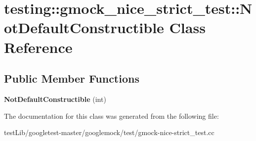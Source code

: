 \hypertarget{classtesting_1_1gmock__nice__strict__test_1_1NotDefaultConstructible}{}\section{testing\+:\+:gmock\+\_\+nice\+\_\+strict\+\_\+test\+:\+:Not\+Default\+Constructible Class Reference}
\label{classtesting_1_1gmock__nice__strict__test_1_1NotDefaultConstructible}
\subsection*{Public Member Functions}
\begin{DoxyCompactItemize}
\item 
\mbox{\label{classtesting_1_1gmock__nice__strict__test_1_1NotDefaultConstructible_acfaca2e03925805192b698708d6030bc}} 
{\bfseries Not\+Default\+Constructible} (int)
\end{DoxyCompactItemize}


The documentation for this class was generated from the following file\+:\begin{DoxyCompactItemize}
\item 
test\+Lib/googletest-\/master/googlemock/test/gmock-\/nice-\/strict\+\_\+test.\+cc\end{DoxyCompactItemize}

